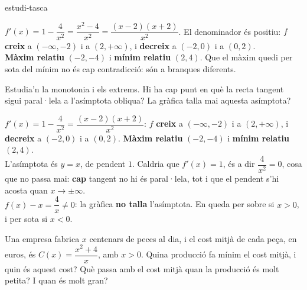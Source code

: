 \begin{apartats}
\begin{tria}{estudi-tasca}
\begin{solucio}
$f'(x)=1-\dfrac{4}{x^2}=\dfrac{x^2-4}{x^2}=\dfrac{(x-2)(x+2)}{x^2}$. El denominador és positiu:
$f$ \textbf{creix} a $(-\infty,-2)$ i a $(2,+\infty)$, i \textbf{decreix} a $(-2,0)$ i a $(0,2)$.\\
\textbf{Màxim relatiu} $(-2,-4)$ i \textbf{mínim relatiu} $(2,4)$. Que el màxim quedi per sota del
mínim no és cap contradicció: són a branques diferents.
\begin{center}
\end{center}
\end{solucio}

Estudia'n la monotonia i els extrems. Hi ha cap punt en què la recta tangent sigui paral·lela a
l'asímptota obliqua? La gràfica talla mai aquesta asímptota?

\begin{solucio}
$f'(x)=1-\dfrac4{x^2}=\dfrac{(x-2)(x+2)}{x^2}$: $f$ \textbf{creix} a $(-\infty,-2)$ i a $(2,+\infty)$,
i \textbf{decreix} a $(-2,0)$ i a $(0,2)$. \textbf{Màxim relatiu} $(-2,-4)$ i \textbf{mínim relatiu}
$(2,4)$.\\
L'asímptota és $y=x$, de pendent $1$. Caldria que $f'(x)=1$, és a dir $\dfrac4{x^2}=0$, cosa que no
passa mai: \textbf{cap} tangent no hi és paral·lela, tot i que el pendent s'hi acosta quan
$x\to\pm\infty$.\\
$f(x)-x=\dfrac4x\neq0$: la gràfica \textbf{no talla} l'asímptota. En queda per sobre si $x>0$, i per
sota si $x<0$.
\end{solucio}

Una empresa fabrica $x$ centenars de peces al dia, i el cost mitjà de cada peça, en euros, és
$C(x)=\dfrac{x^2+4}{x}$, amb $x>0$. Quina producció fa mínim el cost mitjà, i quin és aquest cost? Què passa
amb el cost mitjà quan la producció és molt petita? I quan és molt gran?


\end{tria}
\end{apartats}
